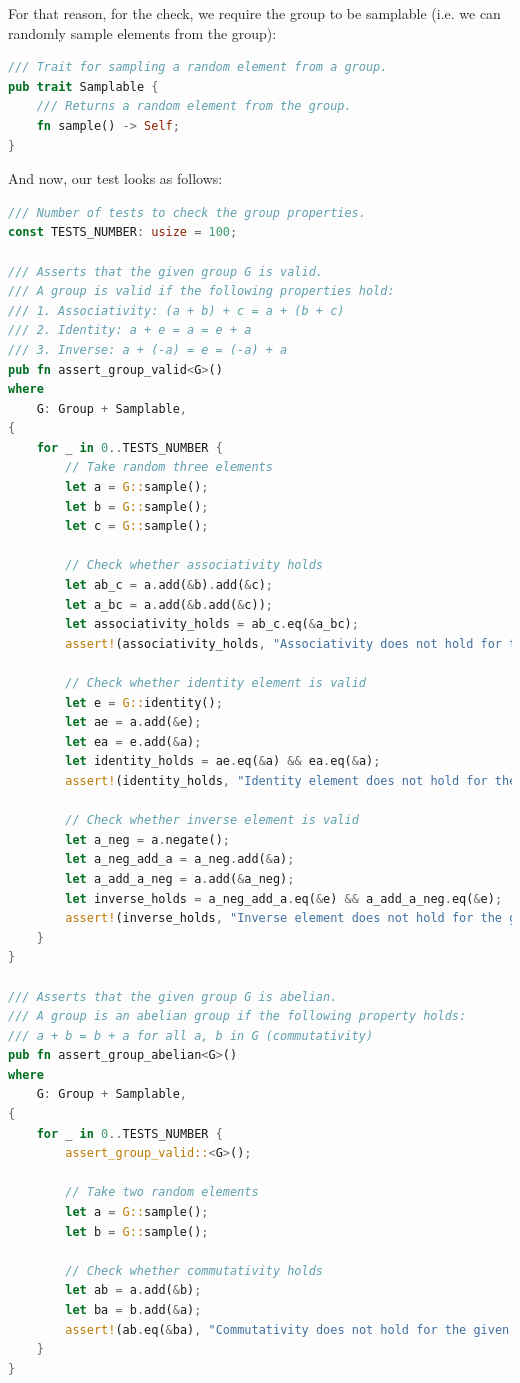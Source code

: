 \documentclass[../lecture-notes.tex]{subfiles}
\begin{document}
For that reason, for the check, we require the group to be samplable (i.e. we can randomly sample elements from the group):
\begin{lstlisting}[language=Rust]
/// Trait for sampling a random element from a group.
pub trait Samplable {
    /// Returns a random element from the group.
    fn sample() -> Self;
}
\end{lstlisting}

And now, our test looks as follows:
\begin{lstlisting}[language=Rust]
/// Number of tests to check the group properties.
const TESTS_NUMBER: usize = 100;

/// Asserts that the given group G is valid.
/// A group is valid if the following properties hold:
/// 1. Associativity: (a + b) + c = a + (b + c)
/// 2. Identity: a + e = a = e + a
/// 3. Inverse: a + (-a) = e = (-a) + a
pub fn assert_group_valid<G>()
where
    G: Group + Samplable,
{
    for _ in 0..TESTS_NUMBER {
        // Take random three elements
        let a = G::sample();
        let b = G::sample();
        let c = G::sample();

        // Check whether associativity holds
        let ab_c = a.add(&b).add(&c);
        let a_bc = a.add(&b.add(&c));
        let associativity_holds = ab_c.eq(&a_bc);
        assert!(associativity_holds, "Associativity does not hold for the given group");

        // Check whether identity element is valid
        let e = G::identity();
        let ae = a.add(&e);
        let ea = e.add(&a);
        let identity_holds = ae.eq(&a) && ea.eq(&a);
        assert!(identity_holds, "Identity element does not hold for the given group");

        // Check whether inverse element is valid
        let a_neg = a.negate();
        let a_neg_add_a = a_neg.add(&a);
        let a_add_a_neg = a.add(&a_neg);
        let inverse_holds = a_neg_add_a.eq(&e) && a_add_a_neg.eq(&e);
        assert!(inverse_holds, "Inverse element does not hold for the given group");
    }
}

/// Asserts that the given group G is abelian.
/// A group is an abelian group if the following property holds:
/// a + b = b + a for all a, b in G (commutativity)
pub fn assert_group_abelian<G>()
where
    G: Group + Samplable,
{
    for _ in 0..TESTS_NUMBER {
        assert_group_valid::<G>();

        // Take two random elements
        let a = G::sample();
        let b = G::sample();

        // Check whether commutativity holds
        let ab = a.add(&b);
        let ba = b.add(&a);
        assert!(ab.eq(&ba), "Commutativity does not hold for the given group");
    }
}    
\end{lstlisting}
\end{document}
